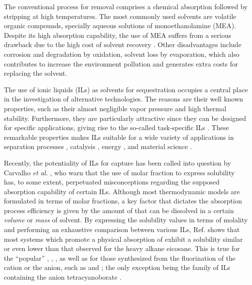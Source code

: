 \documentclass[3p,twocolumn]{elsarticle}
\begin{document}
The conventional process for  removal comprises a chemical absorption followed by stripping at high temperatures. The most commonly used solvents are volatile organic compounds, specially aqueous solutions of monoethanolamine (MEA). Despite its high absorption capability, the use of MEA suffers from a serious drawback due to the high cost of solvent recovery \cite{Merkel_2010}. Other disadvantages include corrosion and degradation by oxidation, solvent loss by evaporation, which also contributes to increase the environment pollution and generates extra costs for replacing the solvent.

The use of ionic liquids (ILs) as solvents for  sequestration occupies a central place in the investigation of alternative technologies. The reasons are their well known properties, such as their almost negligible vapor pressure and high thermal stability. Furthermore, they are particularly attractive since they can be designed for specific applications, giving rise to the so-called task-specific ILs \cite{Seo_2014}. These remarkable properties makes ILs suitable for a wide variety of applications in separation processes \cite{Han_2010,Werner_2010}, catalysis \cite{P_rvulescu_2007}, energy \cite{MacFarlane_2014}, and material science \cite{Mecerreyes_2011,Tom_2015,Dupont_2010,Leones_2017,Kinik_2017}.

Recently, the potentiality of ILs for  capture has been called into question by Carvalho \textit{et al.} \cite{Carvalho_2016}, who warn that the use of molar fraction to express solubility has, to some extent, perpetuated misconceptions regarding the supposed absorption capability of certain ILs. Although most thermodynamic models are formulated in terms of molar fractions, a key factor that dictates the absorption process efficiency is given by the amount of  that can be dissolved in a certain \textit{volume} or \textit{mass} of solvent. By expressing the solubility values in terms of molality and performing an exhaustive comparison between various ILs, Ref. \cite{Carvalho_2016} shows that most systems which promote a physical absorption of  exhibit a solubility similar or even lower than that observed for the heavy alkane eicosane. This is true for the ``popular'' \ce{[bmim][NTf_2]}, \ce{[bmim][PF_6]}, \ce{[bmim][BF_4]}, as well as for those synthesized from the fluorination of the cation or the anion, such as \ce{[(C_2H_2F_2)mim][NTf_2]} and \ce{[hmim][pFAP]}; the only exception being the family of ILs containing the anion tetracyanoborate \ce{[B(CN)_4]^-}.
\end{document}
